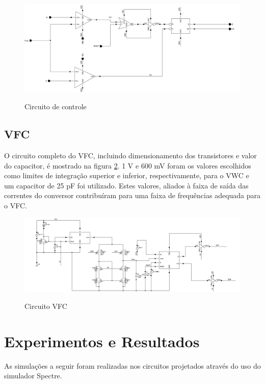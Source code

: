 \documentclass[
	12pt,				%
	oneside,			%
	a4paper,			%
	english,			%
	french,				%
	spanish,			%
	brazil				%
	]{abntex2}
\begin{document}
\begin{figure}[!ht]
  \centering
  \includegraphics[width=450pt]{circuitoVWC.jpg}\\
  \caption{Circuito de controle}\label{circuitoControle}
\end{figure}

\section{VFC}
O circuito completo do VFC, incluindo dimensionamento dos transistores e valor do capacitor, é mostrado na figura \ref{circuitoVFC}. 1 V e 600 mV foram os valores escolhidos como limites de integração superior e inferior, respectivamente, para o VWC e um capacitor de 25 pF foi utilizado. Estes valores, aliados à faixa de saída das correntes do conversor contribuíram para uma faixa de frequências adequada para o VFC. 

\begin{figure}[!ht]
  \centering
  \includegraphics[width=450pt]{circuitoVFC.jpg}\\
  \caption{Circuito VFC}\label{circuitoVFC}
\end{figure}


\chapter{Experimentos e Resultados}
As simulações a seguir foram realizadas nos circuitos projetados através do uso do simulador Spectre. 
\end{document}
